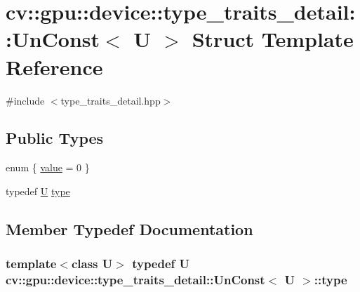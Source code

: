 \hypertarget{structcv_1_1gpu_1_1device_1_1type__traits__detail_1_1UnConst}{\section{cv\-:\-:gpu\-:\-:device\-:\-:type\-\_\-traits\-\_\-detail\-:\-:Un\-Const$<$ U $>$ Struct Template Reference}
\label{structcv_1_1gpu_1_1device_1_1type__traits__detail_1_1UnConst}
}


{\ttfamily \#include $<$type\-\_\-traits\-\_\-detail.\-hpp$>$}

\subsection*{Public Types}
\begin{DoxyCompactItemize}
\item 
enum \{ \hyperlink{structcv_1_1gpu_1_1device_1_1type__traits__detail_1_1UnConst_a495eff4165a47d116ed7a0126447a993a70aeb5a2b8fabebcf62af19336fef949}{value} = 0
 \}
\item 
typedef \hyperlink{core__c_8h_aa9c521f41af9a5191e5e4b6ffbae211a}{U} \hyperlink{structcv_1_1gpu_1_1device_1_1type__traits__detail_1_1UnConst_a33d0b0a87aee0ae2836a956fef27b3ed}{type}
\end{DoxyCompactItemize}


\subsection{Member Typedef Documentation}
\hypertarget{structcv_1_1gpu_1_1device_1_1type__traits__detail_1_1UnConst_a33d0b0a87aee0ae2836a956fef27b3ed}{
\subsubsection[{type}]{\setlength{\rightskip}{0pt plus 5cm}template$<$class U$>$ typedef {\bf U} {\bf cv\-::gpu\-::device\-::type\-\_\-traits\-\_\-detail\-::\-Un\-Const}$<$ {\bf U} $>$\-::{\bf type}}}\label{structcv_1_1gpu_1_1device_1_1type__traits__detail_1_1UnConst_a33d0b0a87aee0ae2836a956fef27b3ed}


